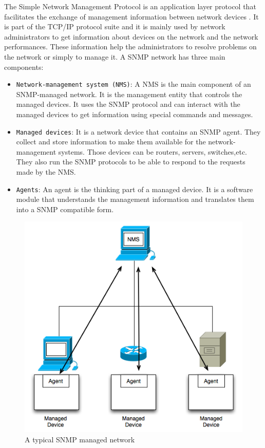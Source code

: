 The Simple Network Management Protocol is an application layer protocol that facilitates the exchange of management information between network devices \cite{snmp}. It is part of the TCP/IP protocol suite and it is mainly used by network administrators to get information about devices on the network and the network performances. These information help the administrators to resolve problems on the network or simply to manage it.
A SNMP network has three main components:

\begin{itemize}
	\item \texttt{Network-management system (NMS)}: A NMS is the main component of an SNMP-managed network. It is the management entity that controls the managed devices. It uses the SNMP protocol and can interact with the managed devices to get information using special commands and messages.
	
	\item \texttt{Managed devices}: It is a network device that contains an SNMP agent. They collect and store information to make them available for the network-management systems. Those devices can be routers, servers, switches,etc. They also run the SNMP protocols to be able to respond to the requests made by the NMS.
	
	\item \texttt{Agents}: An agent is the thinking part of a managed device. It is a software module that understands the management information and translates them into a SNMP compatible form.
\end{itemize}

\begin{figure}[H]
\centering
	\includegraphics[width=.7\linewidth]{Pictures/Chapter2/snmp.png}
	\caption{A typical SNMP managed network}
\end{figure}


